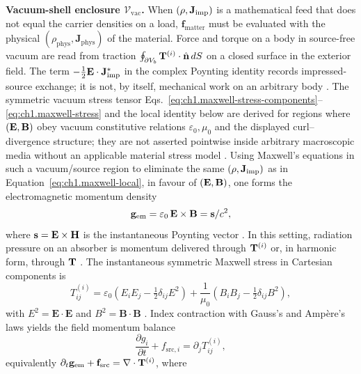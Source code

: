 \textbf{Vacuum-shell enclosure $\mathcal{V}_{\mathrm{vac}}$.} When $(\rho,\mathbf{J}_{\mathrm{imp}})$ is a mathematical feed that does not equal the carrier densities on a load, $\mathbf{f}_{\mathrm{matter}}$ must be evaluated with the physical $(\rho_{\mathrm{phys}},\mathbf{J}_{\mathrm{phys}})$ of the material. Force and torque on a body in source-free vacuum are read from traction $\oint_{\partial V_b}\mathbf{T}^{(i)}\cdot\hat{\mathbf{n}}\,dS$ on a closed surface in the exterior field. The term $-\tfrac12\mathbf{E}\cdot\mathbf{J}_{\mathrm{imp}}^*$ in the complex Poynting identity records impressed-source exchange; it is not, by itself, mechanical work on an arbitrary body \cite{poynting1884,stratton1941,harrington2001}.
The symmetric vacuum stress tensor Eqs.~\eqref{eq:ch1.maxwell-stress-components}--\eqref{eq:ch1.maxwell-stress} and the local identity below are derived for regions where $(\mathbf{E},\mathbf{B})$ obey vacuum constitutive relations $\varepsilon_0,\mu_0$ and the displayed curl--divergence structure; they are not asserted pointwise inside arbitrary macroscopic media without an applicable material stress model \cite{stratton1941}. Using Maxwell's equations in such a vacuum/source region to eliminate the same $(\rho,\mathbf{J}_{\mathrm{imp}})$ as in Equation~\eqref{eq:ch1.maxwell-local}, in favour of $(\mathbf{E},\mathbf{B})$,
one forms the electromagnetic momentum density
\begin{equation}
\label{eq:ch1.momentum-density-instantaneous}
\mathbf{g}_{\mathrm{em}}=\varepsilon_0\,\mathbf{E}\times\mathbf{B}
=\mathbf{s}/c^2,
\end{equation}
where $\mathbf{s}=\mathbf{E}\times\mathbf{H}$ is the instantaneous Poynting vector \cite{maxwell1873,poynting1884}.
In this setting, radiation pressure on an absorber is momentum delivered through $\mathbf{T}^{(i)}$ or, in harmonic form, through $\mathbf{T}$ \cite{maxwell1873,stratton1941}. The instantaneous symmetric Maxwell stress in Cartesian components is
\begin{equation}
\label{eq:ch1.maxwell-stress-components}
T^{(i)}_{ij}=\varepsilon_0\!\left(E_iE_j-\tfrac12\delta_{ij}E^2\right)
+\frac{1}{\mu_0}\!\left(B_iB_j-\tfrac12\delta_{ij}B^2\right),
\end{equation}
with $E^2=\mathbf{E}\cdot\mathbf{E}$ and $B^2=\mathbf{B}\cdot\mathbf{B}$ \cite{maxwell1873,stratton1941}.
Index contraction with Gauss's and Amp\`ere's laws yields the field momentum balance
\begin{equation}
\label{eq:ch1.momentum-balance-instantaneous}
\frac{\partial g_{i}}{\partial t}+f_{\mathrm{src},i}=\partial_j T^{(i)}_{ij},
\end{equation}
equivalently $\partial_t\mathbf{g}_{\mathrm{em}}+\mathbf{f}_{\mathrm{src}}=\nabla\cdot\mathbf{T}^{(i)}$, where
